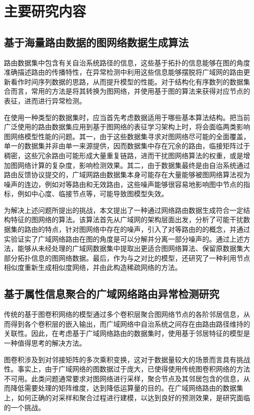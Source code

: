 \section{主要研究内容}

\subsection{基于海量路由数据的图网络数据生成算法}

路由数据集中包含有关自治系统路径的信息，这些基于拓扑的信息能够在图的角度准确描述路由的传播特性，在异常检测中利用这些信息能够摆脱将广域网的路由更新看作时间序列数据的思路，从而提升模型的性能。对于结构化有序数列的数据集合而言，常用的方法是将其转换为图网络，并使用基于图的算法来获得对应节点的表征，进而进行异常检测。

在使用一种类型的数据集时，应当首先考虑数据适用于哪些基本算法结构。把当前广泛使用的路由数据集应用到基于图网络的表征学习架构上时，将会面临两类影响图网络模型性能的问题。其一，由于这些数据集寻求对图网络尽可能的全面覆盖，单一的数据集并非由单一来源提供，因而数据集中存在冗余的路由，临接矩阵过于稠密，这些冗余路由可能形成大量重复链路，进而干扰图网络算法的权重，或是增加图网络计算的复杂度，影响检测效果。其二，由于数据集最终是由自治系统通过路由反馈协议提交的，广域网路由数据集本身可能存在大量能够被图网络算法视为噪声的连边，例如对等路由和无效路由，这些噪声能够很容易地影响图中节点的指标，例如中心度、临接节点等，可能导致图模型失效。

为解决上述问题所提出的挑战，本文提出了一种通过网络路由数据生成符合一定结构特征的图网络的算法。该算法首先从广域网的架构层面出发，分析了可能干扰数据集的路由的特点，针对图网络中存在的噪声，引入了对等路由的的概念，并通过实验证实了广域网络路由在图的角度是可以分解并分离一部分噪声的。通过上述方法，能够从未经处理的广域网数据集中提取出更适合图网络算法、保留原数据集大部分拓扑信息的图网络数据。最后，作为与之对比的模型，还研究了一种利用节点相似度重新生成相似度网络，并由此构造稀疏网络的方法。

\subsection{基于属性信息聚合的广域网络路由异常检测研究}

传统的基于图卷积网络的模型通过多个卷积层聚合图网络节点的各阶邻居信息，从而得到各个卷积层的嵌入输出，而广域网络中自治系统之间存在由路由路径维持的关联性。因此，在考虑基于广域网络路由的数据集时，使用基于邻居特征的模型是一种值得思考的解决方法。

图卷积涉及到对邻接矩阵的多次乘积变换，这对于数据量较大的场景而言具有挑战性。事实上，由于广域网络的图数据过于庞大，已使得使用传统图卷积网络的方法不可用。此类问题通常要求对图网络进行采样，聚合节点及其邻居包含的信息，从而降低需要处理的矩阵维度，达到降低运算量的目的。在广域网络路由的数据集上，如何正确的对采样和聚合过程进行建模，以达到良好的预测效果，是研究面临的一个挑战。

